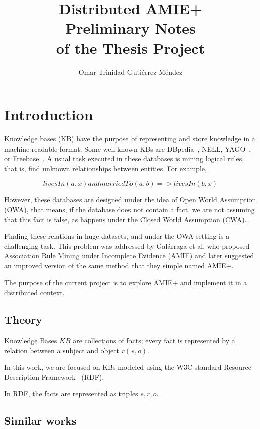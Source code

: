 \documentclass{article}
\title{
Distributed AMIE+\\
\large Preliminary Notes\\
of the Thesis Project\\
}
\author{Omar Trinidad Guti\'errez M\'endez}
\begin{document}
\maketitle

\section{Introduction}

Knowledge bases (KB) have the purpose of representing and store knowledge in a
machine-readable format. Some well-known KBs are DBpedia~\cite{dbpedia-swj},
NELL, YAGO~\cite{suchanek2007yago}, or Freebase~\cite{bollacker2008freebase}. A
usual task executed in these databases is mining logical rules, that is, find
unknown relationships between entities. For example,

\begin{equation*}
livesIn(a, x) and marriedTo(a, b) => livesIn(b, x)
\end{equation*}

However,  these databases are designed under the idea of Open World Assumption
(OWA), that means, if the database does not contain a fact, we are not assuming
that this fact is false, as happens under the Closed World Assumption (CWA).

Finding these relations in huge datasets, and under the OWA setting is a
challenging task. This problem was addressed by Galárraga et al. who proposed
Association Rule Mining under Incomplete Evidence (AMIE) and later suggested an
improved version of the same method that they simple named AMIE+.

The purpose of the current project is to explore AMIE+ and implement it in a
distributed context.

\subsection{Theory}

Knowledge Bases $KB$ are collections of facts; every fact is represented by a
relation between a subject and object $r(s, o)$.

In this work, we are focused on KBs modeled using the W3C standard Resource
Description Framework~\cite{rdf} (RDF).

In RDF, the facts are represented as triples $s, r, o$.


\subsection{Similar works}
\end{document}
